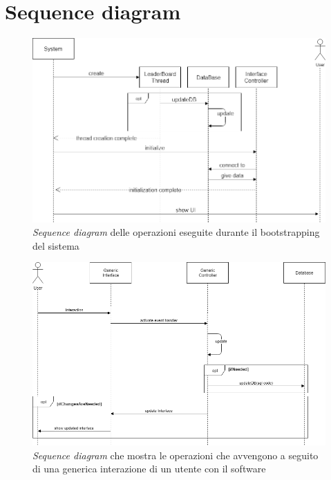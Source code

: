 \documentclass[a4paper,12pt,titlepage]{article}
\begin{document}
{{{\section{Sequence diagram}\label{sec:sequencediagram}
\begin{figure}[H]
		\centering
		\includegraphics[scale=0.5]{sequenceDiagramBootPhase}
		\caption{\textit{Sequence diagram} delle operazioni eseguite durante il bootstrapping del sistema}
\end{figure}
\begin{figure}[H]
		\centering
		\includegraphics[scale=0.5]{sequenceDiagramGenericInteraction}
		\caption{\textit{Sequence diagram} che mostra le operazioni che avvengono a seguito di una generica interazione di un utente con il software}
\end{figure}
\begin{figure}[H]
		\centering

\end{figure}}}}
\end{document}
